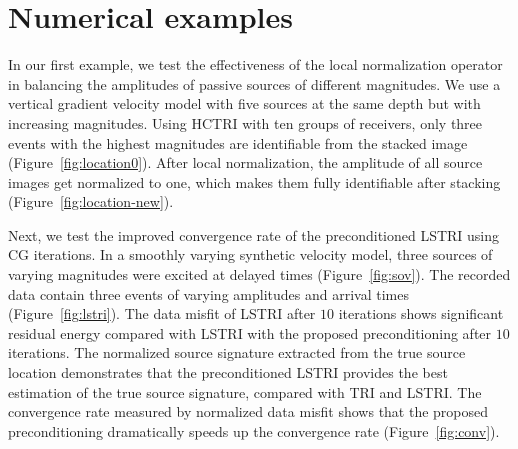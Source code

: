 \section{Numerical examples}

In our first example, we test the effectiveness of the local normalization operator in balancing the amplitudes of passive sources of different magnitudes. We use a vertical gradient velocity model with five sources at the same depth but with increasing magnitudes. Using HCTRI with ten groups of receivers, only three events with the highest magnitudes are identifiable from the stacked image (Figure~\ref{fig:location0}). After local normalization, the amplitude of all source images get normalized to one, which makes them fully identifiable after stacking (Figure~\ref{fig:location-new}).


Next, we test the improved convergence rate of the preconditioned LSTRI using CG iterations. In a smoothly varying synthetic velocity model, three sources of varying magnitudes were excited at delayed times (Figure~\ref{fig:sov}). The recorded data contain three events of varying amplitudes and arrival times (Figure~\ref{fig:lstri}). The data misfit of LSTRI after $10$ iterations shows significant residual energy compared with LSTRI with the proposed preconditioning after $10$ iterations. The normalized source signature extracted from the true source location demonstrates that the preconditioned LSTRI provides the best estimation of the true source signature, compared with TRI and LSTRI. The convergence rate measured by normalized data misfit shows that the proposed preconditioning dramatically speeds up the convergence rate (Figure~\ref{fig:conv}).

